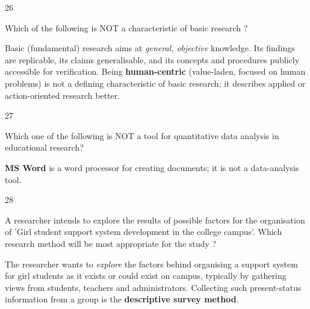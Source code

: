 \begin{question}{26}
{Which of the following is NOT a characteristic of basic research ?\par}
\begin{explain}
Basic (fundamental) research aims at \emph{general, objective} knowledge. Its findings are replicable, its claims generalisable, and its concepts and procedures publicly accessible for verification. Being \textbf{human-centric} (value-laden, focused on human problems) is not a defining characteristic of basic research; it describes applied or action-oriented research better.
\end{explain}
\end{question}

\begin{question}{27}
{Which one of the following is NOT a tool for quantitative data analysis in educational research?\par}
\begin{explain}
\textbf{MS Word} is a word processor for creating documents; it is not a data-analysis tool.
\end{explain}
\end{question}

\begin{question}{28}
{A researcher intends to explore the results of possible factors for the organisation of 'Girl student support system development in the college campus'. Which research method will be most appropriate for the study ?\par}
\begin{explain}
The researcher wants to \emph{explore} the factors behind organising a support system for girl students as it exists or could exist on campus, typically by gathering views from students, teachers and administrators. Collecting such present-status information from a group is the \textbf{descriptive survey method}.
\end{explain}
\end{question}

